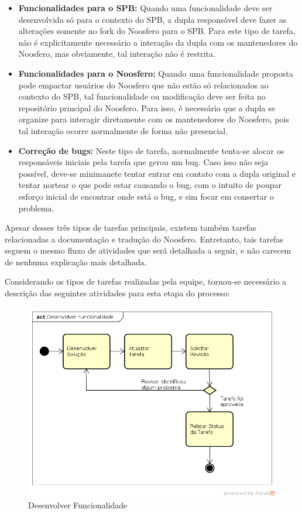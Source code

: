 \documentclass[a4paper, 11pt]{article}
\begin{document}
\begin{itemize}
    \item \textbf{Funcionalidades para o SPB:} Quando uma funcionalidade deve
        ser desenvolvida só para o contexto do SPB, a dupla responsável deve
        fazer as alterações somente no fork do Noosfero para o SPB. Para este
        tipo de tarefa, não é explicitamente necessário a interação da dupla
        com os mantenedores do Noosfero, mas obviamente, tal interação não é
        restrita.
    \item \textbf{Funcionalidades para o Noosfero:} Quando uma funcionalidade
        proposta pode empactar usuários do Noosfero que não estão só
        relacionados ao contexto do SPB, tal funcionalidade ou modificação
        deve ser feita no repositório principal do Noosfero. Para isso, é
        necessário que a dupla se organize para interagir diretamente com os
        mantenedores do Noosfero, pois tal interação ocorre normalmente de
        forma não presencial.
    \item \textbf{Correção de bugs:} Neste tipo de tarefa, normalmente
        tenta-se alocar os responsáveis iniciais pela tarefa que gerou um
        bug. Caso isso não seja possível, deve-se minimanete tentar entrar em
        contato com a dupla original e tentar nortear o que pode estar
        causando o bug, com o intuito de poupar esforço inicial de encontrar
        onde está o bug, e sim focar em consertar o problema.
\end{itemize}

Apesar desses três tipos de tarefas principais, existem também tarefas
relacionadas a documentação e tradução do Noosfero. Entretanto, tais tarefas
seguem o mesmo fluxo de atividades que será detalhada a seguir, e não carecem
de nenhuma explicação mais detalhada.

Considerando os tipos de tarefas realizadas pela equipe, tornou-se necessário
a descrição das seguintes atividades para esta etapa do processo:

\begin{figure}[ht!]
\centering
\includegraphics[width=150mm]{devel_func.png}
\caption{Desenvolver Funcionalidade\label{overflow}}
\end{figure}
\end{document}
